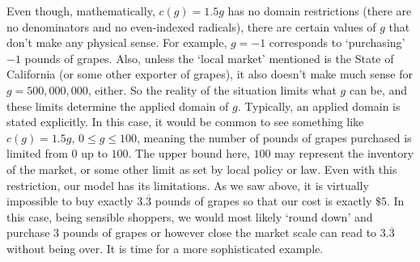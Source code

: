 Even though, mathematically, $c(g) = 1.5g$ has no domain restrictions (there are no denominators and no even-indexed radicals), there are certain values of $g$ that don't make any physical sense.  For example, $g = -1$ corresponds to `purchasing' $-1$ pounds of grapes. Also, unless the `local market' mentioned is the State of California (or some other exporter of grapes), it also doesn't make much sense for $g = 500,000,000$, either. So the reality of the situation limits what $g$ can be, and these limits determine the applied domain of $g$.  Typically, an applied domain is stated explicitly.  In this case, it would be common to see something like $c(g) = 1.5g$, $0 \leq g \leq 100$, meaning the number of pounds of grapes purchased is limited from $0$ up to $100$. The upper bound here, $100$ may represent the inventory of the market, or some other limit as set by local policy or law.  Even with this restriction, our model has its limitations.  As we saw above, it is virtually impossible to buy exactly  $3.\overline{3}$ pounds of grapes so that our cost is exactly $\$5$.  In this case, being sensible shoppers, we would most likely `round down' and purchase $3$ pounds of grapes or however close the market scale can read to $3.\overline{3}$ without being over.  It is time for a more sophisticated example.

